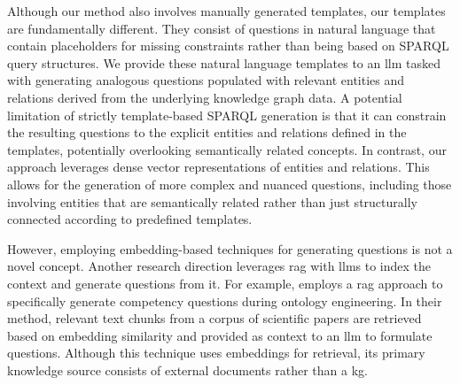 Although our method also involves manually generated templates, our templates are fundamentally different. They consist of questions in natural language that contain placeholders for missing constraints rather than being based on SPARQL query structures. We provide these natural language templates to an \gls{llm} tasked with generating analogous questions populated with relevant entities and relations derived from the underlying knowledge graph data. A potential limitation of strictly template-based SPARQL generation is that it can constrain the resulting questions to the explicit entities and relations defined in the templates, potentially overlooking semantically related concepts. In contrast, our approach leverages dense vector representations of entities and relations. This allows for the generation of more complex and nuanced questions, including those involving entities that are semantically related rather than just structurally connected according to predefined templates.

However, employing embedding-based techniques for generating questions is not a novel concept. Another research direction leverages \gls{rag} with \glspl{llm} to index the context and generate questions from it. For example, \cite{pan_rag_2024} employs a \gls{rag} approach to specifically generate competency questions during ontology engineering. In their method, relevant text chunks from a corpus of scientific papers are retrieved based on embedding similarity and provided as context to an \gls{llm} to formulate questions. Although this technique uses embeddings for retrieval, its primary knowledge source consists of external documents rather than a \gls{kg}.





